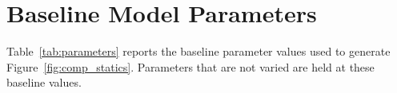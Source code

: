 \documentclass[12pt]{article}
\begin{document}
\newpage




\ifdefined\isdraft\else

\newpage
\appendix

\section{Baseline Model Parameters} \label{app:parameters}

Table~\ref{tab:parameters} reports the baseline parameter values used to generate Figure~\ref{fig:comp_statics}. Parameters that are not varied are held at these baseline values.



\fi
\end{document}
